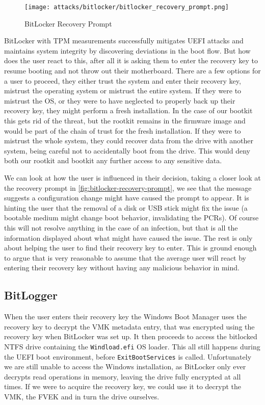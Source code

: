 \begin{figure}[htb]
    \centering
    \texttt{[image: attacks/bitlocker/bitlocker\_recovery\_prompt.png]}
    \caption{BitLocker Recovery Prompt}
    \label{fig:bitlocker-recovery-prompt}
\end{figure}

BitLocker with \ac{TPM} measurements successfully mitigates \ac{UEFI} attacks and maintains system integrity by discovering deviations in the boot flow.
But how does the user react to this, after all it is asking them to enter the recovery key to resume booting and not throw out their motherboard.
There are a few options for a user to proceed, they either trust the system and enter their recovery key, mistrust the operating system or mistrust the entire system.
If they were to mistrust the \ac{OS}, or they were to have neglected to properly back up their recovery key, they might perform a fresh installation.
In the case of our bootkit this gets rid of the threat, but the rootkit remains in the firmware image and would be part of the chain of trust for the fresh installation.
If they were to mistrust the whole system, they could recover data from the drive with another system, being careful not to accidentally boot from the drive.
This would deny both our rootkit and bootkit any further access to any sensitive data.

We can look at how the user is influenced in their decision, taking a closer look at the recovery prompt in \autoref{fig:bitlocker-recovery-prompt}, we see that the message suggests a configuration change might have caused the prompt to appear. It is hinting the user that the removal of a disk or \ac{USB} stick might fix the issue (a bootable medium might change boot behavior, invalidating the \acp{PCR}). Of course this will not resolve anything in the case of an infection, but that is all the information displayed about what might have caused the issue. The rest is only about helping the user to find their recovery key to enter.
This is ground enough to argue that is very reasonable to assume that the average user will react by entering their recovery key without having any malicious behavior in mind.


\subsection{BitLogger}

When the user enters their recovery key the Windows Boot Manager uses the recovery key to decrypt the \ac{VMK} metadata entry, that was encrypted using the recovery key when BitLocker was set up.
It then proceeds to access the bitlocked \ac{NTFS} drive containing the \lstinline{Windload.efi} \ac{OS} loader.
This all still happens during the \ac{UEFI} boot environment, before \lstinline{ExitBootServices} is called.
Unfortunately we are still unable to access the Windows installation, as BitLocker only ever decrypts read operations in memory, leaving the drive fully encrypted at all times.
If we were to acquire the recovery key, we could use it to decrypt the \ac{VMK}, the \ac{FVEK} and in turn the drive ourselves.

